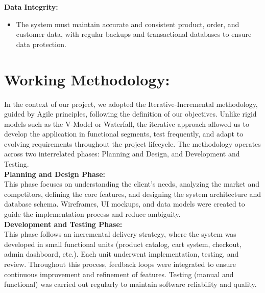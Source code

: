 \textbf{Data Integrity:}\\

\begin{itemize}[label=\textbullet]
    \item The system must maintain accurate and consistent product, order, and customer data, with regular backups and transactional databases to ensure data protection.
\end{itemize}

\section{Working Methodology:}

In the context of our project, we adopted the Iterative-Incremental methodology,
guided by Agile principles, following the definition of our objectives. Unlike rigid models
such as the V-Model or Waterfall, the iterative approach allowed us to develop the
application in functional segments, test frequently, and adapt to evolving requirements
throughout the project lifecycle. The methodology operates across two interrelated phases: Planning and Design, and
Development and Testing.\\

\textbf{Planning and Design Phase:}\\

This phase focuses on understanding the client’s needs, analyzing the market and
competitors, defining the core features, and designing the system architecture and database schema.
Wireframes, UI mockups, and data models were created to guide the implementation process
and reduce ambiguity.\\

\textbf{Development and Testing Phase:}\\

This phase follows an incremental delivery strategy, where the system was developed
in small functional units (product catalog, cart system, checkout, admin dashboard, etc.).
Each unit underwent implementation, testing, and review.
Throughout this process, feedback loops were integrated to ensure continuous improvement
and refinement of features.
Testing (manual and functional) was carried out regularly to maintain software reliability and
quality.

